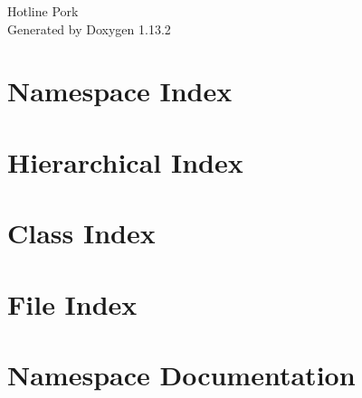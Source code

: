 \documentclass[twoside]{book}
\newcommand{\+}{\discretionary{\mbox{\scriptsize$\hookleftarrow$}}{}{}}
\newcommand{\clearemptydoublepage}{%
    \newpage{\pagestyle{empty}\cleardoublepage}%
  }
\begin{document}
  \raggedbottom
    \hypersetup{pageanchor=false,
                bookmarksnumbered=true,
                pdfencoding=unicode
               }
  \begin{titlepage}
  \vspace*{7cm}
  \begin{center}%
  {\Large Hotline Pork}\\
  \vspace*{1cm}
  {\large Generated by Doxygen 1.13.2}\\
  \end{center}
  \end{titlepage}
  \clearemptydoublepage
  \tableofcontents
  \clearemptydoublepage
  \hypersetup{pageanchor=true}
\chapter{Namespace Index}

\chapter{Hierarchical Index}

\chapter{Class Index}

\chapter{File Index}

\chapter{Namespace Documentation}























\end{document}
